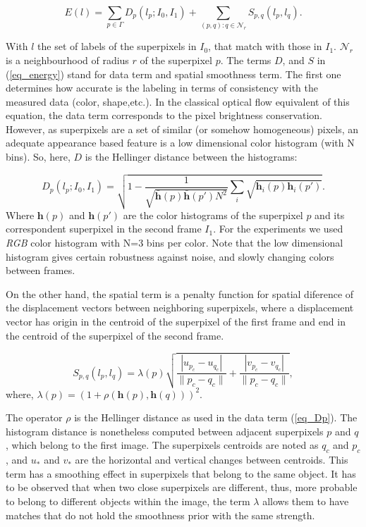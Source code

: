 \begin{equation}
E(l) = \displaystyle \sum_{p \in \Gamma} D_p(l_p;I_0,I_1) +
\sum_{(p,q): q \in \mathcal{N}_r} S_{p,q}(l_p,l_q) .
\label{eq_energy}
\end{equation}

With $l$ the set of labels of the superpixels in $I_0$,
that match with those in $I_1$. $\mathcal{N}_r$ is a neighbourhood of radius $r$ of the superpixel $p$.
The terms $D$, and $S$ in (\ref{eq_energy}) stand for data term and spatial smoothness term. 
The first one determines how accurate is the labeling in terms
of consistency with the measured data (color, shape,etc.). In the classical optical flow equivalent of this equation,
the data term corresponds to the pixel brightness conservation\cite{c7}\cite{c5}. However, as superpixels are a set
of similar (or somehow homogeneous) pixels, an adequate appearance based feature is a low dimensional
color histogram (with N bins). So, here, $D$ is the Hellinger distance between the histograms:

\begin{equation}
D_p(l_p;I_0,I_1) = \sqrt{ 1 - \frac{1}{\sqrt{\bar{ \boldsymbol{h} }(p) \bar{ \boldsymbol{h} }(p')N^2} } \sum_{i}\sqrt{ \boldsymbol{h}_{i}(p) \boldsymbol{h}_{i}(p')} }.
\label{eq_Dp}
\end{equation}
Where $\textbf{h}(p)$ and $\textbf{h}(p')$ are the color histograms of the superpixel $p$ and its correspondent superpixel in the
second frame $I_1$. For the experiments we used {\it RGB} color histogram with N=3 bins per color.
Note that the low dimensional histogram gives certain robustness against noise,
and slowly changing colors between frames. 

On the other hand, the spatial term is a penalty function for spatial diference of the displacement vectors between neighboring superpixels, where a displacement vector has origin 
in the centroid of the superpixel of the first frame and
end in the centroid of the superpixel of the second frame.

\begin{equation}
S_{p,q}(l_p, l_q) = \lambda(p)
  \sqrt{\frac{|u_{p_c}-u_{q_c}|}{\|p_c-q_c\|}+ \frac{|v_{p_c}-v_{q_c}|}{\|p_c-q_c\|}},
\label{eq_Spq}
\end{equation}
 where, $ \lambda(p) = (1 + \rho(\boldsymbol{h}(p),\boldsymbol{h}(q)))^2 $.

The operator $\rho$ is the Hellinger distance as used in the
data term (\ref{eq_Dp}). The histogram distance is nonetheless computed between adjacent superpixels $p$ and $q$, 
which belong to the first image. The superpixels centroids are noted as $q_c$ and $p_c$, 
and $u_{*}$ and $v_{*}$ are the horizontal and vertical changes between centroids.
This term has a smoothing effect in superpixels that belong to the
same object. It has to be observed that when two close superpixels are different, thus, more probable to
belong to different objects within the image, the term $\lambda$ allows them to have
matches that do not hold the smoothness prior with the same strength. 

